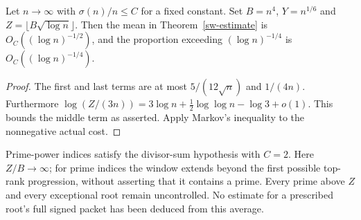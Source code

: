 \begin{corollary}\label{sw-beyond}
Let $n\to\infty$ with $\sigma(n)/n\le C$ for a fixed constant.
Set $B=n^4$, $Y=n^{1/6}$ and $Z=\lfloor B\sqrt{\log n}\rfloor$.
Then the mean in Theorem~\ref{sw-estimate} is
$O_C((\log n)^{-1/2})$, and the proportion exceeding
$(\log n)^{-1/4}$ is $O_C((\log n)^{-1/4})$.
\end{corollary}
\begin{proof}
The first and last terms are at most $5/(12\sqrt n)$ and $1/(4n)$.
Furthermore
$\log(Z/(3n))=3\log n+\tfrac12\log\log n-\log3+o(1)$.
This bounds the middle term as asserted. Apply Markov's inequality
to the nonnegative actual cost.
\end{proof}

Prime-power indices satisfy the divisor-sum hypothesis with $C=2$.
Here $Z/B\to\infty$; for prime indices the window extends beyond the
first possible top-rank progression, without asserting that it contains
a prime. Every prime above $Z$ and every exceptional root remain
uncontrolled. No estimate for a prescribed root's full signed packet
has been deduced from this average.
